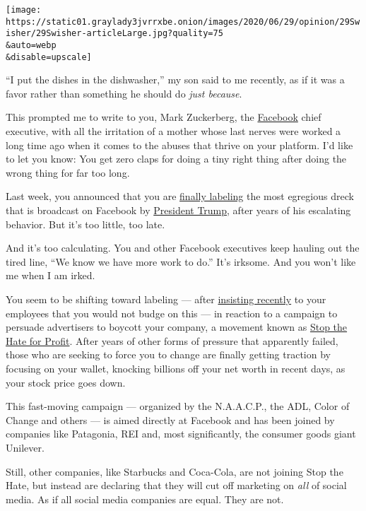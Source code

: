 \texttt{[image: https://static01.graylady3jvrrxbe.onion/images/2020/06/29/opinion/29Swisher/29Swisher-articleLarge.jpg?quality=75\\\&auto=webp\\\&disable=upscale]}

``I put the dishes in the dishwasher,'' my son said to me recently, as
if it was a favor rather than something he should do \emph{just
because}.

This prompted me to write to you, Mark Zuckerberg, the
\href{https://www.nytimes3xbfgragh.onion/2020/06/30/us/politics/brad-parscale-trump.html}{Facebook}
chief executive, with all the irritation of a mother whose last nerves
were worked a long time ago when it comes to the abuses that thrive on
your platform. I'd like to let you know: You get zero claps for doing a
tiny right thing after doing the wrong thing for far too long.

Last week, you announced that you are
\href{https://www.nytimes3xbfgragh.onion/2020/06/26/technology/facebook-labels-advertisers.html}{finally
labeling} the most egregious dreck that is broadcast on Facebook by
\href{https://www.nytimes3xbfgragh.onion/2020/06/30/us/politics/brad-parscale-trump.html}{President
Trump}, after years of his escalating behavior. But it's too little, too
late.

And it's too calculating. You and other Facebook executives keep hauling
out the tired line, ``We know we have more work to do.'' It's irksome.
And you won't like me when I am irked.

You seem to be shifting toward labeling --- after
\href{https://www.nytimes3xbfgragh.onion/2020/06/02/technology/zuckerberg-defends-facebook-trump-posts.html}{insisting
recently} to your employees that you would not budge on this --- in
reaction to a campaign to persuade advertisers to boycott your company,
a movement known as \href{https://www.stophateforprofit.org/}{Stop the
Hate for Profit}. After years of other forms of pressure that apparently
failed, those who are seeking to force you to change are finally getting
traction by focusing on your wallet, knocking billions off your net
worth in recent days, as your stock price goes down.

This fast-moving campaign --- organized by the N.A.A.C.P., the ADL,
Color of Change and others --- is aimed directly at Facebook and has
been joined by companies like Patagonia, REI and, most significantly,
the consumer goods giant Unilever.

Still, other companies, like Starbucks and Coca-Cola, are not joining
Stop the Hate, but instead are declaring that they will cut off
marketing on \emph{all} of social media. As if all social media
companies are equal. They are not.

